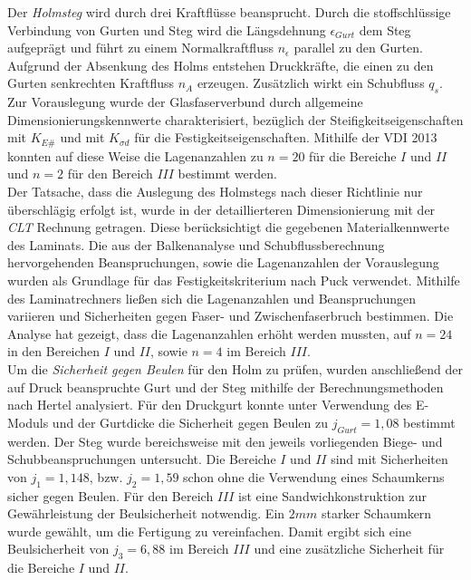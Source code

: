 \noindent Der \textit{Holmsteg} wird durch drei Kraftflüsse beansprucht. Durch die stoffschlüssige Verbindung von Gurten und Steg wird die Längsdehnung $ \epsilon_{Gurt} $ dem Steg aufgeprägt und führt zu einem Normalkraftfluss $ n_{\epsilon} $ parallel zu den Gurten. Aufgrund der Absenkung des Holms entstehen Druckkräfte, die einen zu den Gurten senkrechten Kraftfluss $ n_{A} $ erzeugen. Zusätzlich wirkt ein Schubfluss $ q_{s} $. Zur Vorauslegung wurde der Glasfaserverbund durch allgemeine Dimensionierungskennwerte charakterisiert, bezüglich der Steifigkeitseigenschaften mit $ K_{E\#} $ und mit $ K_{\sigma d} $ für die Festigkeitseigenschaften. Mithilfe der VDI 2013 konnten auf diese Weise die Lagenanzahlen zu $ n=20 $ für die Bereiche $ I $ und $ II $ und $ n=2 $ für den Bereich $ III $ bestimmt werden.\\

\noindent Der Tatsache, dass die Auslegung des Holmstegs nach dieser Richtlinie nur überschlägig erfolgt ist, wurde in der detaillierteren Dimensionierung mit der \textit{CLT} Rechnung getragen. Diese berücksichtigt die gegebenen Materialkennwerte des Laminats. Die aus der Balkenanalyse und Schubflussberechnung hervorgehenden Beanspruchungen, sowie die Lagenanzahlen der Vorauslegung wurden als Grundlage für das Festigkeitskriterium nach Puck verwendet. Mithilfe des Laminatrechners ließen sich die Lagenanzahlen und Beanspruchungen variieren und Sicherheiten gegen Faser- und Zwischenfaserbruch bestimmen. Die Analyse hat gezeigt, dass die Lagenanzahlen erhöht werden mussten, auf $ n=24 $ in den Bereichen $I$ und $II$, sowie $ n=4 $ im Bereich $ III $.\\

\noindent Um die \textit{Sicherheit gegen Beulen} für den Holm zu prüfen, wurden anschließend der auf Druck beanspruchte Gurt und der Steg mithilfe der Berechnungsmethoden nach Hertel analysiert. Für den Druckgurt konnte unter Verwendung des E-Moduls und der Gurtdicke die Sicherheit gegen Beulen zu $ j_{Gurt}=1,08 $ bestimmt werden. Der Steg wurde bereichsweise mit den jeweils vorliegenden Biege- und Schubbeanspruchungen untersucht. Die Bereiche $ I $ und $ II $ sind mit Sicherheiten von $ j_{1}=1,148 $, bzw. $ j_{2}=1,59 $ schon ohne die Verwendung eines Schaumkerns sicher gegen Beulen. Für den Bereich $ III $ ist eine Sandwichkonstruktion zur Gewährleistung der Beulsicherheit notwendig. Ein $ 2mm $ starker Schaumkern wurde gewählt, um die Fertigung zu vereinfachen. Damit ergibt sich eine Beulsicherheit von $ j_{3}=6,88 $ im Bereich $ III $ und eine zusätzliche Sicherheit für die Bereiche $ I $ und $ II $.\\

